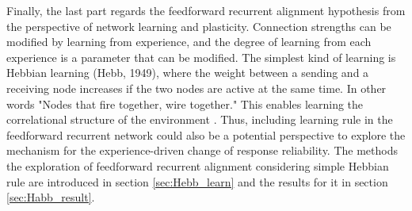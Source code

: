 \documentclass[11pt]{article}
\begin{document}
	Finally, the last part regards the feedforward recurrent alignment hypothesis from the perspective of network learning and plasticity.  Connection strengths can be modified by learning from experience, and the degree of learning from each experience is a parameter that can be modified. The simplest kind of learning is Hebbian learning (Hebb, 1949), where the weight between a sending and a receiving node increases if the two nodes are active at the same time. In other words "Nodes that fire together, wire together." This enables learning the correlational structure of the environment \cite{read2021neural}. Thus, including learning rule in the feedforward recurrent network could also be a potential perspective to explore the mechanism for the experience-driven change of response reliability. The methods the exploration of feedforward recurrent alignment considering simple Hebbian rule are introduced in section \ref{sec:Hebb_learn} and the results for it in section \ref{sec:Habb_result}. 
	
		

\end{document}
